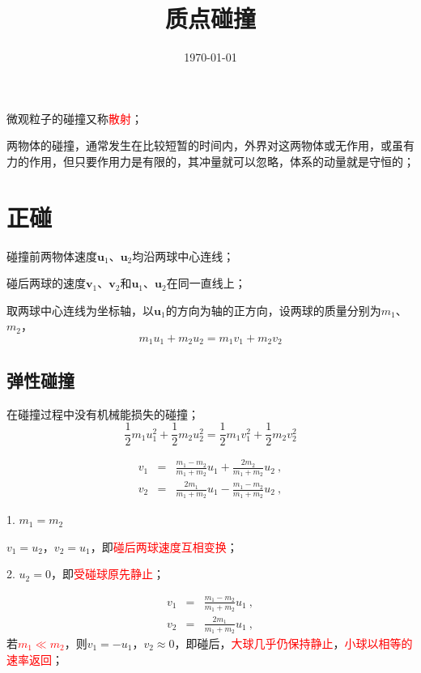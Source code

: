 \documentclass[11pt,a4paper]{article}
\title{质点碰撞}
\author{}
\date{\today}
\renewcommand{\vec}[1]{\boldsymbol{#1}}
\begin{document}
\maketitle

微观粒子的碰撞又称\textcolor{red}{散射}；

两物体的碰撞，通常发生在比较短暂的时间内，外界对这两物体或无作用，或虽有力的作用，但只要作用力是有限的，其冲量就可以忽略，体系的动量就是守恒的；
\section{正碰}
碰撞前两物体速度$\vec{u}_1$、$\vec{u}_2$均沿两球中心连线；

碰后两球的速度$\vec{v}_1$、$\vec{v}_2$和$\vec{u}_1$、$\vec{u}_2$在同一直线上；

取两球中心连线为坐标轴，以$\vec{u}_1$的方向为轴的正方向，设两球的质量分别为$m_1$、$m_2$，
\begin{equation}
m_1 u_1 + m_2 u_2 = m_1 v_1 + m_2 v_2
\end{equation}

\subsection{弹性碰撞}
在碰撞过程中没有机械能损失的碰撞；
\begin{equation}
\frac{1}{2} m_1 u_1^2 +\frac{1}{2} m_2 u_2^2 = \frac{1}{2} m_1 v_1^2 +\frac{1}{2} m_2 v_2^2
\end{equation}

\begin{eqnarray}
\nonumber v_1 &=& \frac{m_1 -m_2}{m_1 +m_2} u_1 +\frac{2m_2}{m_1 +m_2} u_2 ~,\\
v_2 &=& \frac{2m_1}{m_1 +m_2} u_1 -\frac{m_1 -m_2}{m_1 +m_2} u_2 ~,
\end{eqnarray}

1. $m_1 = m_2$

$v_1 = u_2$，$v_2 = u_1$，即\textcolor{red}{碰后两球速度互相变换}；

2. $u_2 = 0$，即\textcolor{red}{受碰球原先静止}；

\begin{eqnarray}
\nonumber v_1 &=& \frac{m_1 -m_2}{m_1 +m_2} u_1 ~, \\
v_2 &=& \frac{2m_1}{m_1 +m_2} u_1 ~,
\end{eqnarray}
若\textcolor{red}{$m_1 \ll m_2$}，则$v_1 = -u_1$，$v_2 \approx 0$，即碰后，\textcolor{red}{大球几乎仍保持静止}，\textcolor{red}{小球以相等的速率返回}；
\end{document}
